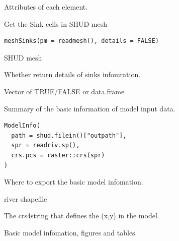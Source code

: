 \documentclass[a4paper]{book}
\begin{document}
%
\begin{Value}
Attributes of each element.
\end{Value}
%
\begin{Description}\relax
Get the Sink cells in SHUD mesh
\end{Description}
%
\begin{Usage}
\begin{verbatim}
meshSinks(pm = readmesh(), details = FALSE)
\end{verbatim}
\end{Usage}
%
\begin{Arguments}
\begin{ldescription}
\item[\code{pm}] SHUD mesh

\item[\code{details}] Whether return details of sinks infomration.
\end{ldescription}
\end{Arguments}
%
\begin{Value}
Vector of TRUE/FALSE or data.frame
\end{Value}
%
\begin{Description}\relax
Summary of the basic information of model input data.
\end{Description}
%
\begin{Usage}
\begin{verbatim}
ModelInfo(
  path = shud.filein()["outpath"],
  spr = readriv.sp(),
  crs.pcs = raster::crs(spr)
)
\end{verbatim}
\end{Usage}
%
\begin{Arguments}
\begin{ldescription}
\item[\code{path}] Where to export the basic model infomation.

\item[\code{spr}] river shapefile

\item[\code{crs.pcs}] The crs4string that defines the (x,y) in the model.
\end{ldescription}
\end{Arguments}
%
\begin{Value}
Basic model infomation, figures and tables
\end{Value}
\end{document}
